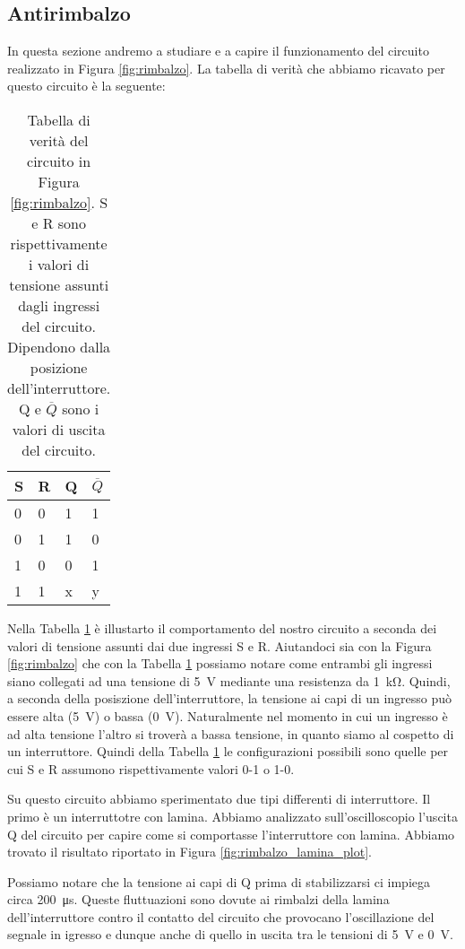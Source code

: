 \subsection*{Antirimbalzo}

In questa sezione andremo a studiare e a capire il funzionamento del circuito realizzato in Figura \ref{fig:rimbalzo}.
La tabella di verità che abbiamo ricavato per questo circuito è la seguente:

\begin{table}[h]
    \centering
    \begin{tabular}{ll|ll}
	\toprule
		S & R & Q & $\overline{Q}$ \\
	\midrule
		0 & 0 & 1 & 1 \\
		0 & 1 & 1 & 0 \\
		1 & 0 & 0 & 1 \\
		1 & 1 & x & y \\
	\bottomrule
	\end{tabular}
    \caption{Tabella di verità del circuito in Figura \ref{fig:rimbalzo}. S e R sono rispettivamente i valori di tensione assunti dagli ingressi del circuito. Dipendono dalla posizione dell'interruttore. Q e $\overline{Q}$ sono i valori di uscita del circuito.}
    \label{tab:rimbalzo}
\end{table}

Nella Tabella \ref{tab:rimbalzo} è illustarto il comportamento del nostro circuito a seconda dei valori di tensione assunti dai due ingressi S e R. Aiutandoci sia con la Figura \ref{fig:rimbalzo} che con la Tabella \ref{tab:rimbalzo} possiamo notare come entrambi gli ingressi siano collegati ad una tensione di \SI{+5}{\volt} mediante una resistenza da \SI{1}{\kilo\ohm}. Quindi, a seconda della posiszione dell'interruttore, la tensione ai capi di un ingresso può essere alta (\SI{+5}{\volt}) o bassa (\SI{0}{\volt}). Naturalmente nel momento in cui un ingresso è ad alta tensione l'altro si troverà a bassa tensione, in quanto siamo al cospetto di un interruttore. Quindi della Tabella \ref{tab:rimbalzo} le configurazioni possibili sono quelle per cui S e R assumono rispettivamente valori 0-1 o 1-0.

Su questo circuito abbiamo sperimentato due tipi differenti di interruttore. Il primo è un interruttotre con lamina. Abbiamo analizzato sull'oscilloscopio l'uscita Q del circuito per capire come si comportasse l'interruttore con lamina. Abbiamo trovato il risultato riportato in Figura \ref{fig:rimbalzo_lamina_plot}.

Possiamo notare che la tensione ai capi di Q prima di stabilizzarsi ci impiega circa \SI{200}{\micro\second}. Queste fluttuazioni sono dovute ai rimbalzi della lamina dell'interruttore contro il contatto del circuito che provocano l'oscillazione del segnale in igresso e dunque anche di quello in uscita tra le tensioni di \SI{+5}{\volt} e \SI{0}{\volt}.


